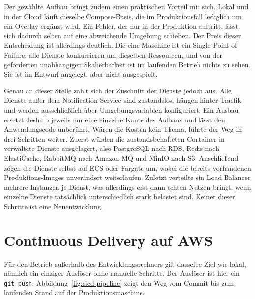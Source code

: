 Der gewählte Aufbau bringt zudem einen praktischen Vorteil mit sich. Lokal und in der Cloud läuft dieselbe Compose-Basis, die im Produktionsfall lediglich um ein Overlay ergänzt wird. Ein Fehler, der nur in der Produktion auftritt, lässt sich dadurch selten auf eine abweichende Umgebung schieben. Der Preis dieser Entscheidung ist allerdings deutlich. Die eine Maschine ist ein Single Point of Failure, alle Dienste konkurrieren um dieselben Ressourcen, und von der geforderten unabhängigen Skalierbarkeit ist im laufenden Betrieb nichts zu sehen. Sie ist im Entwurf angelegt, aber nicht ausgespielt.

Genau an dieser Stelle zahlt sich der Zuschnitt der Dienste jedoch aus. Alle Dienste außer dem Notification-Service sind zustandslos, hängen hinter Traefik und werden ausschließlich über Umgebungsvariablen konfiguriert. Ein Ausbau ersetzt deshalb jeweils nur eine einzelne Kante des Aufbaus und lässt den Anwendungscode unberührt. Wären die Kosten kein Thema, führte der Weg in drei Schritten weiter. Zuerst würden die zustandsbehafteten Container in verwaltete Dienste ausgelagert, also PostgreSQL nach RDS, Redis nach ElastiCache, RabbitMQ nach Amazon MQ und MinIO nach S3. Anschließend zögen die Dienste selbst auf ECS oder Fargate um, wobei die bereits vorhandenen Produktions-Images unverändert weiterlaufen. Zuletzt verteilte ein Load Balancer mehrere Instanzen je Dienst, was allerdings erst dann echten Nutzen bringt, wenn einzelne Dienste tatsächlich unterschiedlich stark belastet sind. Keiner dieser Schritte ist eine Neuentwicklung.

\section{Continuous Delivery auf AWS}
\label{sec:cicd}

Für den Betrieb außerhalb des Entwicklungsrechners gilt dasselbe Ziel wie lokal, nämlich ein einziger Auslöser ohne manuelle Schritte. Der Auslöser ist hier ein \texttt{git push}. Abbildung~\vref{fig:cicd-pipeline} zeigt den Weg vom Commit bis zum laufenden Stand auf der Produktionsmaschine.

